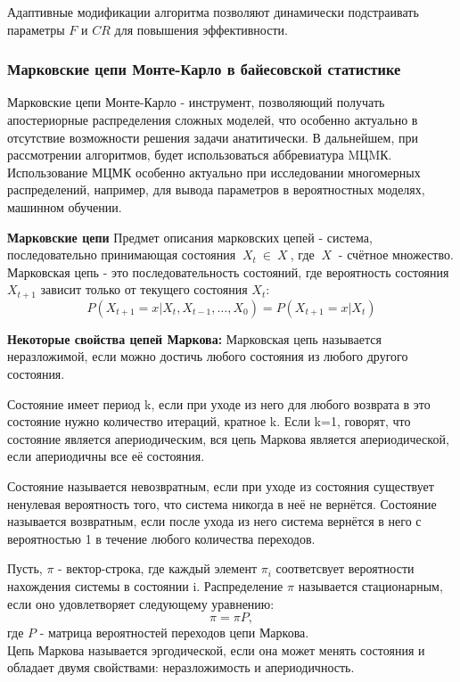 \documentclass[a4paper]{article}
\begin{document}
Адаптивные модификации алгоритма позволяют динамически подстраивать параметры \( F \) и \( CR \) для повышения эффективности.

\subsubsection{Марковские цепи Монте-Карло в байесовской статистике}
Марковские цепи Монте-Карло - инструмент, позволяющий получать апостериорные распределения сложных моделей, что особенно актуально в отсутствие возможности решения задачи анатитически. В дальнейшем, при рассмотрении алгоритмов, будет использоваться аббревиатура MЦMК. Использование МЦМК особенно актуально при исследовании многомерных распределений, например, для вывода параметров в вероятностных моделях, машинном обучении.

\textbf{Марковские цепи}
Предмет описания марковских цепей - система, последовательно принимающая состояния $\ X_t\  \in\ X\ $, где $\ X\ $ - счётное множество. Марковская цепь - это последовательность состояний, где вероятность состояния $X_{t+1}$ зависит только от текущего состояния $ X_t $:
\begin{equation}
    P(X_{t+1} = x | X_t, X_{t-1}, \dots, X_0) = P(X_{t+1} = x | X_t)
\end{equation}

\textbf{Некоторые свойства цепей Маркова:}
Марковская цепь называется неразложимой, если можно достичь любого состояния из любого другого состояния. 

Состояние имеет период k, если при уходе из него для любого возврата в это состояние нужно количество итераций, кратное k. Если k=1, говорят, что состояние является апериодическим, вся цепь Маркова является апериодической, если апериодичны все её состояния.

Состояние называется невозвратным, если при уходе из состояния существует ненулевая вероятность того, что система никогда в неё не вернётся. Состояние называется возвратным, если после ухода из него система вернётся в него с вероятностью 1 в течение любого количества переходов.

Пусть, $\pi$ - вектор-строка, где каждый элемент $\pi_i$ соответсвует вероятности нахождения системы в состоянии i. Распределение $\pi$ называется стационарным, если оно удовлетворяет следующему уравнению:
\begin{equation*}
    \pi = \pi P,
\end{equation*}
где $P$ - матрица вероятностей переходов цепи Маркова.\\
Цепь Маркова называется эргодической, если она может менять состояния и обладает двумя свойствами: неразложимость и апериодичность.
\end{document}
